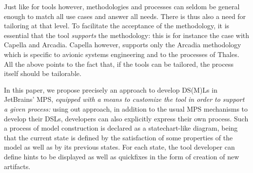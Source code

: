 Just like for tools however, methodologies and processes can seldom be general
enough to match all use cases and answer all needs. There is thus also a need
for tailoring at that level. To facilitate the acceptance of the methodology, it
is essential that the tool \emph{supports} the methodology: this is for instance
the case with Capella and Arcadia.
Capella however, supports only the Arcadia methodology which is specific to
avionic systems engineering and to the processes of Thales.
All the above points to the fact that, if the tools can be tailored, the process
itself should be tailorable.

In this paper, we propose precisely an approach to develop DS(M)Ls in JetBrains'
MPS, \emph{equipped with a means to customize the tool in order to support a
given process:} using out approach, in addition to the usual MPS mechanisms to
develop their DSLs, developers can also explicitly express their own process.
Such a process of model construction is declared as a
statechart-like diagram, being that the current state is defined by the
satisfaction of some properties of the model as well as by its previous states.
For each state, the tool developer can define hints to be displayed as well as
quickfixes in the form of creation of new artifacts.

